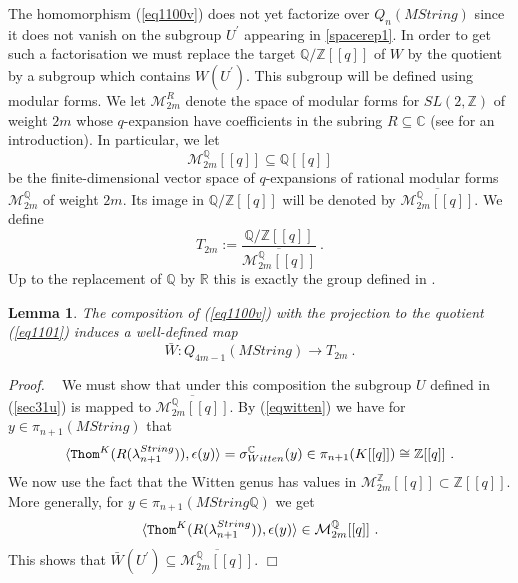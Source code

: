 \documentclass[12pt]{article}
\newtheorem{lem}[theorem]{Lemma}
\newcommand{\Thom}{{\tt Thom}}
\newcommand{\cM}{{\mathcal{M}}}
\def\hB{\hspace*{\fill}$\Box$ \newline\noindent}
\newcommand{\proof}{{\it Proof.$\:\:\:\:$}}
\newcommand{\Z}{{\mathbb{Z}}}
\newcommand{\Q}{{\mathbb{Q}}}
\newcommand{\R}{{\mathbb{R}}}
\newcommand{\C}{{\mathbb{C}}}
\begin{document}
The homomorphism (\ref{eq1100v}) does not yet factorize over  $Q_{n}(MString)$ since it does not vanish on the subgroup $U^{\prime}$ appearing in  \eqref{spacerep1}. In order to get such a factorisation we must replace the target $\Q/\Z[[q]]$ of $W$ by  the quotient  by a subgroup which contains $W(U^{\prime})$. This subgroup will be defined using modular forms.
 We let $\cM^{R}_{2m}$ denote the space of modular forms for $SL(2,\Z)$ of weight $2m$
 whose $q$-expansion have coefficients in the subring $R\subseteq \C$ (see \cite{MR1189136} for an introduction).
 In particular, we let
 $$\cM^{\Q}_{2m}[[q]]\subseteq \Q[[q]]$$ be the finite-dimensional vector space of $q$-expansions of rational modular forms $\cM^{\Q}_{2m}$ of weight $2m$. Its image in $\Q/\Z[[q]]$ will be denoted by 
 $\overline{\cM^{\Q}_{2m}[[q]]}$.
 We define
 \begin{equation}\label{eq1101}T_{2m}:=\frac{\Q/\Z[[q]]}{\overline{\cM^{\Q}_{2m}[[q]]}}\ .\end{equation}
 Up to the replacement of $\Q$ by $\R$ this is exactly the group defined in \cite[Def. 1.1]{2009arXiv0912.4875B}.
 \begin{lem}\label{lem1092}
 The composition of (\ref{eq1100v}) with the projection to the quotient (\ref{eq1101})
 induces a well-defined map
 $$\bar W:Q_{4m-1}(MString)\to T_{2m}\ .$$
 \end{lem}
 \proof
 We must show that under this composition 
 the subgroup $U$ defined in (\ref{sec31u})
 is mapped to $\overline{\cM^{\Q}_{2m}[[q]]}$. By (\ref{eqwitten}) we have for 
 $y\in \pi_{n+1}(MString)$ that  
$$   \langle \Thom^{K}(R(\lambda_{n+1}^{String})), \epsilon(y)\rangle=\sigma^{\C}_{Witten}(y)\in \pi_{n+1}(K[[q]])\cong \Z[[q]]\ .$$ We now use the fact that
 the Witten genus has values in $\cM_{2m}^{\Z}[[q]]\subset \Z[[q]] $.
 More generally, for $y\in \pi_{n+1}(MString\Q)$ we get 
 $$\langle  \Thom^{K}(R(\lambda_{n+1}^{String})),  \epsilon(y)\rangle\in \cM_{2m}^{\Q}[[q]]\ .$$  
 This shows that $\bar W(U^{\prime})\subseteq \overline{\cM^{\Q}_{2m}[[q]]}$. \hB 
 
\end{document}
